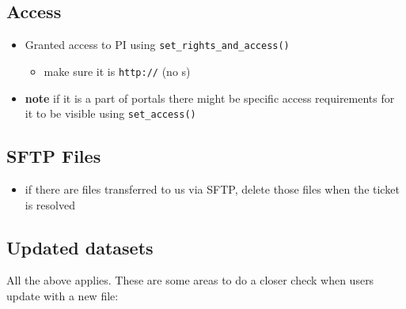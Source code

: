 \documentclass[
  letterpaper,
  DIV=11,
  numbers=noendperiod]{scrreprt}
\providecommand{\tightlist}{%
  \setlength{\itemsep}{0pt}\setlength{\parskip}{0pt}}\usepackage{longtable,booktabs,array}
\begin{document}
\hypertarget{access}{%
\subsection{Access}\label{access}}

\begin{itemize}
\tightlist
\item
  Granted access to PI using \texttt{set\_rights\_and\_access()}

  \begin{itemize}
  \tightlist
  \item
    make sure it is \texttt{http://} (no s)
  \end{itemize}
\item
  \textbf{note} if it is a part of portals there might be specific
  access requirements for it to be visible using \texttt{set\_access()}
\end{itemize}

\hypertarget{sftp-files}{%
\subsection{SFTP Files}\label{sftp-files}}

\begin{itemize}
\tightlist
\item
  if there are files transferred to us via SFTP, delete those files when
  the ticket is resolved
\end{itemize}

\hypertarget{updated-datasets}{%
\subsection{Updated datasets}\label{updated-datasets}}

All the above applies. These are some areas to do a closer check when
users update with a new file:
\end{document}
